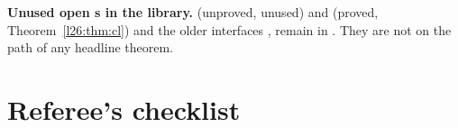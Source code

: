 \begin{warning}
\textbf{Unused open s in the library.}  (unproved, unused) and  (proved, Theorem~\ref{l26:thm:cl}) and the
older interfaces ,  remain in . They are not on the path
of any headline theorem.
\end{warning}

\section{Referee's checklist}\label{l26:sec:checklist}

